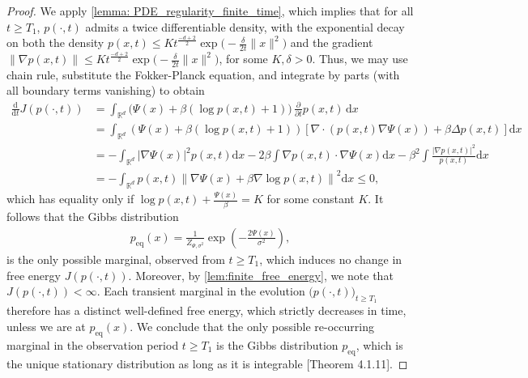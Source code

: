 \documentclass[twoside]{article}
\newcommand{\R} {\mathbb R}
\newcommand{\dx}{\mathrm{d}x}
\begin{document}
\begin{proof}
We apply \cref{lemma: PDE_regularity_finite_time}, which implies that for all $t \ge T_1$, $p(\cdot, t)$ admits a twice differentiable density, with the exponential decay on both the density
$p(x,t) \le Kt^{\frac{-d+2}{2}} \exp\bigl(-\frac{\delta}{2t}\|x\|^2 \bigr)$ and the gradient $\|\nabla p(x,t)\| \le Kt^{\frac{-d+2}{2}} \exp\bigl(-\frac{\delta}{2t}\|x\|^2 \bigr)$, for some $K, \delta > 0$. Thus, we may use chain rule, substitute the Fokker-Planck equation, and integrate by parts (with all boundary terms vanishing) to obtain
\begin{align}
\frac{\text{d}}{\text{d}t} J(p(\cdot,t))
&= \int_{\mathbb{R}^d} \bigl(\Psi(x) + \beta(\log p(x,t) + 1)\bigr)\,\frac{\partial}{\partial t} p(x,t)\, \dx\\
&= \int_{\R^d} \left(\Psi(x) + \beta(\log p(x,t) + 1) \right)\left[\nabla\cdot  (p(x,t) \nabla \Psi(x) ) + \beta\Delta p(x,t) \right]\dx\\
&= -\int_{\R^d} |\nabla \Psi(x)|^2 p(x,t)\dx - 2 \beta \int \nabla p(x,t) \cdot \nabla \Psi(x)\dx  - \beta^2 \int \frac{|\nabla p(x,t)|^2}{p(x,t)}\dx \\
&= - \int_{\R^d}p(x,t)\left\| \nabla \Psi(x) + \beta \nabla \log p(x,t)\right\|^2\dx \le 0,
\end{align}
which has equality only if $\log p(x,t) + \frac{\Psi(x)}{\beta}=K$ for some constant $K$. It follows that the Gibbs distribution
\begin{align*}
p_{\mathrm{eq}}(x) = \frac{1}{Z_{\Psi, \sigma^2}} \exp\left(-\frac{2\Psi(x)}{\sigma^2}\right),
\end{align*}
is the only possible marginal, observed from $t \ge T_1$, which induces no change in free energy $J(p(\cdot,t))$. Moreover, by \cref{lem:finite_free_energy}, we note that $J(p(\cdot, t))<\infty$. Each transient marginal in the evolution $\bigl(p(\cdot, t)\bigr)_{t \ge T_1}$ therefore has a distinct well-defined free energy, which strictly decreases in time, unless we are at $p_{\mathrm{eq}}(x)$. We conclude that the only possible re-occurring marginal in the observation period $t \ge T_1$ is the Gibbs distribution $p_{\mathrm{eq}}$, which is the unique stationary distribution as long as it is integrable \citep{bogachev2022fokker}[Theorem 4.1.11]. 
\end{proof}
\end{document}

